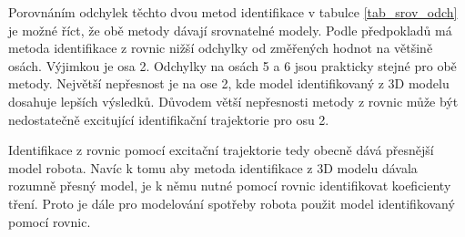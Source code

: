 Porovnáním odchylek těchto dvou metod identifikace v tabulce \ref{tab_srov_odch} je možné říct, že obě metody dávají srovnatelné modely. Podle předpokladů má metoda identifikace z rovnic nižší odchylky od změřených hodnot na většině osách. Výjimkou je osa 2. Odchylky na osách 5 a 6 jsou prakticky stejné pro obě metody. Největší nepřesnost je na ose 2, kde model identifikovaný z 3D modelu dosahuje lepších výsledků. Důvodem větší nepřesnosti metody z rovnic může být nedostatečně excitující identifikační trajektorie pro osu 2.

Identifikace z rovnic pomocí excitační trajektorie tedy obecně dává přesnější model robota. Navíc k tomu aby metoda identifikace z 3D modelu dávala rozumně přesný model, je k němu nutné pomocí rovnic identifikovat koeficienty tření. Proto je dále pro modelování spotřeby robota použit model identifikovaný pomocí rovnic.